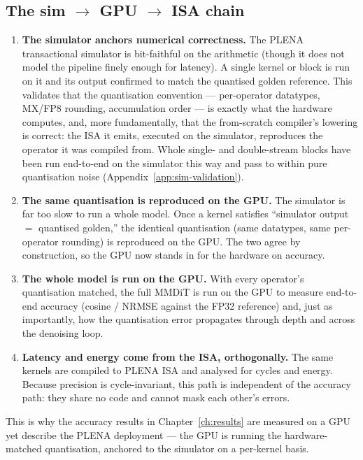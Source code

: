 \documentclass[11pt]{report}
\begin{document}
\subsection{The sim $\to$ GPU $\to$ ISA chain}
\label{sec:impl-verify}

\begin{enumerate}
\item \textbf{The simulator anchors numerical correctness.} The PLENA
transactional simulator is bit-faithful on the arithmetic (though it does
not model the pipeline finely enough for latency). A single kernel or block
is run on it and its output confirmed to match the quantised golden
reference. This validates that the quantisation convention --- per-operator
datatypes, MX/FP8 rounding, accumulation order --- is exactly what the
hardware computes, and, more fundamentally, that the from-scratch compiler's
lowering is correct: the ISA it emits, executed on the simulator, reproduces
the operator it was compiled from. Whole single- and double-stream blocks
have been run end-to-end on the simulator this way and pass to within pure
quantisation noise (Appendix~\ref{app:sim-validation}).
\item \textbf{The same quantisation is reproduced on the GPU.} The simulator
is far too slow to run a whole model. Once a kernel satisfies ``simulator
output $=$ quantised golden,'' the identical quantisation (same datatypes,
same per-operator rounding) is reproduced on the GPU. The two agree by
construction, so the GPU now stands in for the hardware on accuracy.
\item \textbf{The whole model is run on the GPU.} With every operator's
quantisation matched, the full MMDiT is run on the GPU to measure
end-to-end accuracy (cosine / NRMSE against the FP32 reference) and, just as
importantly, how the quantisation error propagates through depth and across
the denoising loop.
\item \textbf{Latency and energy come from the ISA, orthogonally.} The same
kernels are compiled to PLENA ISA and analysed for cycles and energy.
Because precision is cycle-invariant, this path is independent of the
accuracy path: they share no code and cannot mask each other's errors.
\end{enumerate}

This is why the accuracy results in Chapter~\ref{ch:results} are measured on
a GPU yet describe the PLENA deployment --- the GPU is running the
hardware-matched quantisation, anchored to the simulator on a per-kernel
basis.
\end{document}
